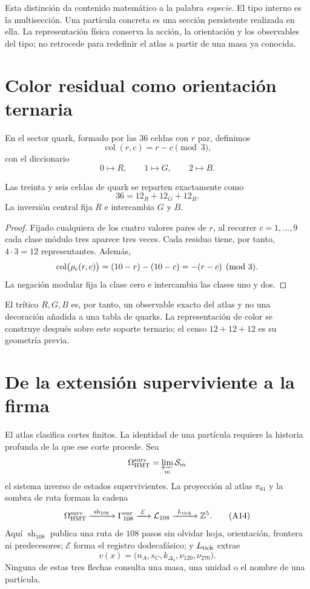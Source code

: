 Esta distinción da contenido matemático a la palabra \emph{especie}.  El tipo
interno es la multisección.  Una partícula concreta es una sección
persistente realizada en ella.  La representación física conserva la acción,
la orientación y los observables del tipo; no retrocede para redefinir el
atlas a partir de una masa ya conocida.

\section{Color residual como orientación ternaria}

En el sector quark, formado por las \(36\) celdas con \(r\) par, definimos
\[
 \operatorname{col}(r,c)=r-c\pmod3,
 \tag{A12}\label{eq:color-residual-atlas-rev6}
\]
con el diccionario
\[
 0\longmapsto R,\qquad1\longmapsto G,\qquad2\longmapsto B.
\]

\begin{proposition}
\label{prop:color-atlas}
Las treinta y seis celdas de quark se reparten exactamente como
\[
 36=12_R+12_G+12_B.
 \tag{A13}\label{eq:balance-color-atlas-rev6}
\]
La inversión central fija \(R\) e intercambia \(G\) y \(B\).
\end{proposition}

\begin{proof}
Fijado cualquiera de los cuatro valores pares de \(r\), al recorrer
\(c=1,\ldots,9\) cada clase módulo tres aparece tres veces.  Cada residuo
tiene, por tanto, \(4\cdot3=12\) representantes.  Además,
\[
 \operatorname{col}\bigl(\rho_{\rm c}(r,c)\bigr)
 =(10-r)-(10-c)
 =-(r-c)\pmod3.
\]
La negación modular fija la clase cero e intercambia las clases uno y dos.
\end{proof}

El trítico \(R,G,B\) es, por tanto, un observable exacto del atlas y no una
decoración añadida a una tabla de quarks.  La representación de color se
construye después sobre este soporte ternario; el censo \(12+12+12\) es su
geometría previa.

\section{De la extensión superviviente a la firma}

El atlas clasifica cortes finitos.  La identidad de una partícula requiere la
historia profunda de la que ese corte procede.  Sea
\[
 \Omega_{\rm HMT}^{\rm surv}
 =\varprojlim_m\mathcal S_m
\]
el sistema inverso de estados supervivientes.  La proyección al atlas \(\pi_{81}\) y la sombra
de ruta forman la cadena
\[
 \Omega_{\rm HMT}^{\rm surv}
 \xrightarrow{\ \operatorname{sh}_{108}\ }
 \Gamma_{108}^{\rm enr}
 \xrightarrow{\ \mathcal E\ }
 \mathcal L_{108}
 \xrightarrow{\ L_{\rm tick}\ }
 \mathbb Z^5.
 \tag{A14}\label{eq:cadena-extension-firma-atlas-rev6}
\]
Aquí \(\operatorname{sh}_{108}\) publica una ruta de \(108\) pasos sin
olvidar hoja, orientación, frontera ni predecesores; \(\mathcal E\) forma el
registro dodecafásico; y \(L_{\rm tick}\) extrae
\[
 v(x)=
 \bigl(n_A,s_C,k_{\Delta_4},\nu_{120},\nu_{270}\bigr).
 \tag{A15}\label{eq:firma-cinco-extension-rev6}
\]
Ninguna de estas tres flechas consulta una masa, una unidad o el nombre de
una partícula.

